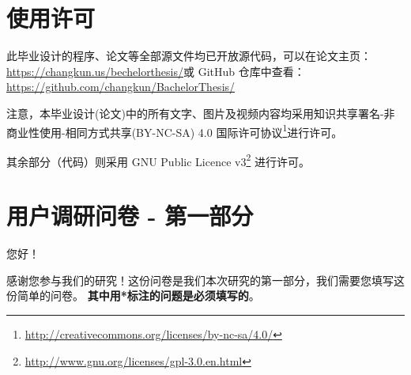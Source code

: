
\appendix

  \chapter{使用许可}
  \label{appendix:a}

  此毕业设计的程序、论文等全部源文件均已开放源代码，可以在论文主页：\url{https://changkun.us/bechelorthesis/}或 GitHub 仓库中查看：\url{https://github.com/changkun/BachelorThesis/}

  注意，本毕业设计(论文)中的所有文字、图片及视频内容均采用知识共享署名-非商业性使用-相同方式共享(BY-NC-SA) 4.0 国际许可协议\footnote{\url{http://creativecommons.org/licenses/by-nc-sa/4.0/}}进行许可。

  其余部分（代码）则采用 GNU Public Licence v3\footnote{\url{http://www.gnu.org/licenses/gpl-3.0.en.html}} 进行许可。

  \cleardoublepage

  \chapter{用户调研问卷 - 第一部分}
  \label{appendix:b}

  您好！

  感谢您参与我们的研究！这份问卷是我们本次研究的第一部分，我们需要您填写这份简单的问卷。
  \textbf{其中用*标注的问题是必须填写的}。

